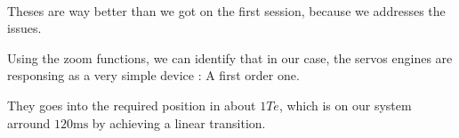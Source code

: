 \paragraph{}
Theses are way better than we got on the first session, because we addresses the issues.

Using the zoom functions, we can identify that in our case, the servos engines are responsing
as a very simple device : A first order one.

They goes into the required position in about $1 Te$, which is on our system arround
$120 \si{\milli\second}$ by achieving a linear transition.

